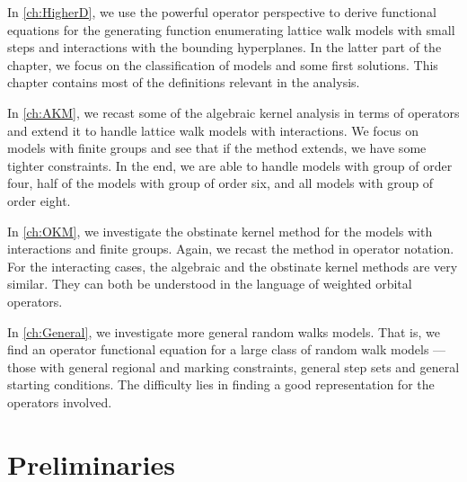 In \autoref{ch:HigherD}, we use the powerful operator perspective to derive functional equations for the generating function enumerating \highD lattice walk models with small steps and interactions with the bounding hyperplanes. In the latter part of the chapter, we focus on the classification of \twoD models and some first solutions. This chapter contains most of the definitions relevant in the analysis.

In \autoref{ch:AKM}, we recast some of the algebraic kernel analysis in terms of operators and extend it to handle lattice walk models with interactions. We focus on \twoD models with finite groups and see that if the method extends, we have some tighter constraints. In the end, we are able to handle \highSym models with group of order four, half of the models with group of order six, and all models with group of order eight.

In \autoref{ch:OKM}, we investigate the obstinate kernel method for the \twoD models with interactions and finite groups. Again, we recast the method in operator notation. For the interacting cases, the algebraic and the obstinate kernel methods are very similar. They can both be understood in the language of weighted orbital operators.

In \autoref{ch:General}, we investigate more general random walks models. That is, we find an operator functional equation for a large class of random walk models --- those with general regional and marking constraints, general step sets and general starting conditions. The difficulty lies in finding a good representation for the operators involved.

\section{Preliminaries}

